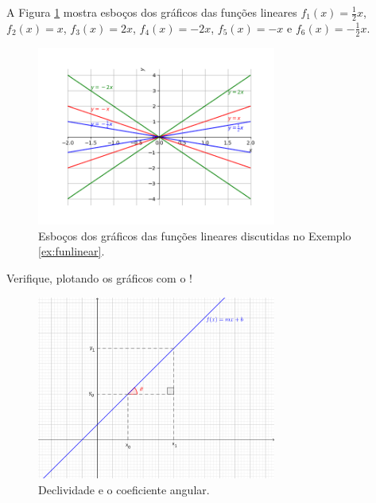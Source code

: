 \begin{ex}\label{ex:funlinear}
  A Figura \ref{fig:ex_funlinear} mostra esboços dos gráficos das funções lineares $f_1(x)=\frac{1}{2}x$, $f_2(x) = x$, $f_3(x) = 2x$, $f_4(x)=-2x$, $f_5(x)=-x$ e $f_6(x)=-\frac{1}{2}x$.
  
  \begin{figure}[H]
    \centering
    \includegraphics[width=0.7\textwidth]{./cap_funcao/dados/fig_ex_funlinear/fig_ex_funlinear}
    \caption{Esboços dos gráficos das funções lineares discutidas no Exemplo \ref{ex:funlinear}.}
    \label{fig:ex_funlinear}
  \end{figure}

  \ifispython
  Verifique, plotando os gráficos com o \sympy!
\end{ex}

\begin{figure}[H]
  \centering
  \includegraphics[width=0.7\textwidth]{./cap_funcao/dados/fig_declividade/fig_declividade}
  \caption{Declividade e o coeficiente angular.}
  \label{fig:declividade}
\end{figure}

